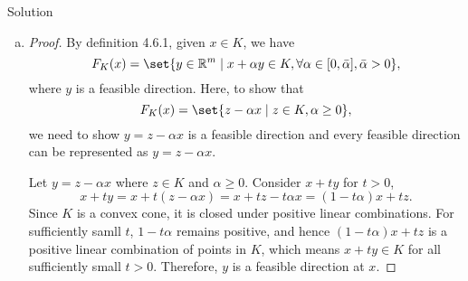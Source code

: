 \documentclass{article}
\begin{document}
\begin{solution}
    {Solution}
    \begin{enumerate}[(a)]
        \item {
            \begin{proof}
                By definition 4.6.1, given $x\in K$, we have \[F_K(x)=\set{y\in\R^m\mid x+\alpha y\in K, \forall \alpha\in[0,\bar{\alpha}], \bar{\alpha}>0},\] where $y$ is a feasible direction. Here, to show that \[F_K(x)=\set{z-\alpha x\mid z\in K, \alpha\geq 0},\] we need to show $y=z-\alpha x$ is a feasible direction and every feasible direction can be represented as $y=z-\alpha x$.

                Let $y=z-\alpha x$ where $z\in K$ and $\alpha\geq 0$. Consider $x+ty$ for $t>0$, \[x+ty=x+t(z-\alpha x)=x+tz-t\alpha x=(1-t\alpha)x+tz.\] Since $K$ is a convex cone, it is closed under positive linear combinations. For sufficiently samll $t$, $1-t\alpha$ remains positive, and hence $(1-t\alpha)x+tz$ is a positive linear combination of points in $K$, which means $x+ty\in K$ for all sufficiently small $t>0$. Therefore, $y$ is a feasible direction at $x$.


\end{proof}}
\end{enumerate}
\end{solution}
\end{document}
